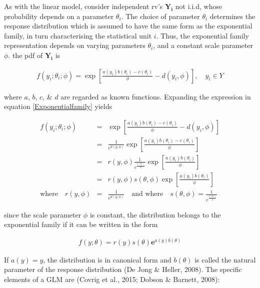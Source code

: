 \documentclass{DissertateUSU}
\begin{document}
As with the linear model, consider independent rv's \(\mathbf{Y_i}\) not
i.i.d, whose probability depends on a parameter \(\theta_i\). The choice
of parameter \(\theta_i\) determines the response distribution which is
assumed to have the same form as the exponential family, in turn
characterising the statistical unit \(i\). Thus, the exponential family
representation depends on varying parameters \(\theta_i\), and a
constant scale parameter \(\phi\). the pdf of \(\mathbf{Y_i}\) is

\singlespacing

\begin{eqnarray}\label{Exponentialfamily}
f(y_i;\theta_i;\phi) = \exp\left[\frac{a(y_i)b(\theta_i) -c(\theta_i)}{\phi}-d(y_i,\phi)\right], \quad y_i \in Y 
\end{eqnarray} \doublespacing

where \(a\), \(b\), \(c\), \& \(d\) are regarded as known functions.
Expanding the expression in equation \ref{Exponentialfamily} yields

\singlespacing

\begin{eqnarray}\label{Exponentialfamilies}
f(y_i;\theta_i;\phi) &=& \exp\left[\frac{a(y_i)b(\theta_i) -c(\theta_i)}{\phi}-d(y_i,\phi)\right] \nonumber\\
 &=& \frac{1}{e^{d(y,\phi)}}\exp\left[\frac{a(y_i)b(\theta_i) -c(\theta_i)}{\phi}\right] \nonumber\\
 &=& r(y,\phi)\frac{1}{e^{\frac{c(\theta_i)}{\phi}}}\exp\left[\frac{a(y_i)b(\theta_i)}{\phi}\right] \nonumber\\
 &=& r(y,\phi)s(\theta,\phi)\exp\left[\frac{a(y_i)b(\theta_i)}{\phi}\right]\\
 \mbox{where} \quad r(y,\phi) &=& \frac{1}{e^{d(y,\phi)}}\quad \mbox{and where}\quad s(\theta,\phi) = \frac{1}{e^{\frac{c(\theta_i)}{\phi}}}\nonumber
\end{eqnarray} \doublespacing

since the scale parameter \(\phi\) is constant, the distribution belongs
to the exponential family if it can be written in the form

\singlespacing

\begin{eqnarray}\label{Exponential}
f(y;\theta) = r(y)s(\theta)\mathbf{e}^{a(y)b(\theta)}
\end{eqnarray} \doublespacing

If \(a(y) = y\), the distribution is in canonical form and \(b(\theta)\)
is called the natural parameter of the response distribution (De Jong \&
Heller, 2008). The specific elements of a GLM are (Covrig et al., 2015;
Dobson \& Barnett, 2008):
\end{document}
